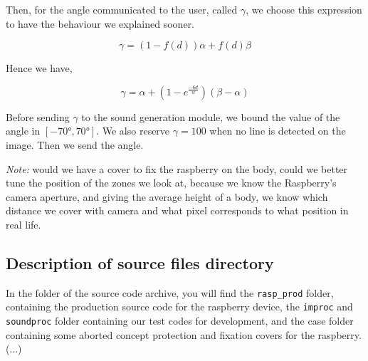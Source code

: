 \documentclass{rapport}
\begin{document}
Then, for the angle communicated to the user, called \(\gamma\), we choose this expression to have the behaviour we explained sooner.

\[ \gamma = (1 - f(d))\alpha + f(d)\beta \]

Hence we have,

\[ \gamma = \alpha + (1 - e^{\frac{-6d}{w}})(\beta - \alpha) \]

Before sending \(\gamma\) to the sound generation module, we bound the value of the angle in \([-70°, 70°]\). We also reserve \(\gamma = 100\) when no line is detected on the image. Then we send the angle.

\textit{Note:} would we have a cover to fix the raspberry on the body, could we better tune the position of the zones we look at, because we know the Raspberry's camera aperture, and giving the average height of a body, we know which distance we cover with camera and what pixel corresponds to what position in real life.

\subsection{Description of source files directory}

In the folder of the source code archive, you will find the \verb|rasp_prod| folder, containing the production source code for the raspberry device, the \verb|improc| and \verb|soundproc| folder containing our test codes for development, and the case folder containing some aborted concept protection and fixation covers for the raspberry. (...)
\end{document}
